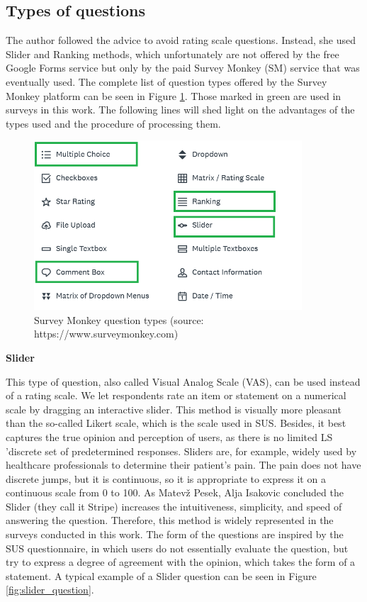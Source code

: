 \documentclass[a4paper,10pt,twoside]{article}
\begin{document}
\subsection{Types of questions}

\noindent The author followed the advice to avoid rating scale questions. Instead, she used Slider and Ranking methods, which unfortunately are not offered by the free Google Forms service but only by the paid Survey Monkey (SM) service that was eventually used. The complete list of question types offered by the Survey Monkey platform can be seen in Figure \ref{fig:survey_monkey_options}. Those marked in green are used in surveys in this work. The following lines will shed light on the advantages of the types used and the procedure of processing them.

\vspace{0.3cm}
\begin{figure}[hbt!] 
\begin{center}
\includegraphics[width=10cm]{../pictures/survey_monkey_options.png} 
\caption[Survey Monkey answer types ]{Survey Monkey question types (source: https://www.surveymonkey.com)}
\label{fig:survey_monkey_options}
\end{center}
\end{figure}


\noindent \textbf {Slider}
\label{sec:slider}

\noindent This type of question, also called Visual Analog Scale (VAS), can be used instead of a rating scale. We let respondents rate an item or statement on a numerical scale by dragging an interactive slider. This method is visually more pleasant than the so-called Likert scale, which is the scale used in SUS. Besides, it best captures the true opinion and perception of users, as there is no limited LS 'discrete set of predetermined responses. Sliders are, for example, widely used by healthcare professionals to determine their patient's pain. The pain does not have discrete jumps, but it is continuous, so it is appropriate to express it on a continuous scale from 0 to 100. As Matevž Pesek, Alja Isakovic concluded the Slider (they call it Stripe) increases the intuitiveness, simplicity, and speed of answering the question. Therefore, this method is widely represented in the surveys conducted in this work. The form of the questions are inspired by the SUS questionnaire, in which users do not essentially evaluate the question, but try to express a degree of agreement with the opinion, which takes the form of a statement. A typical example of a Slider question can be seen in Figure \ref{fig:slider_question}.
\end{document}
